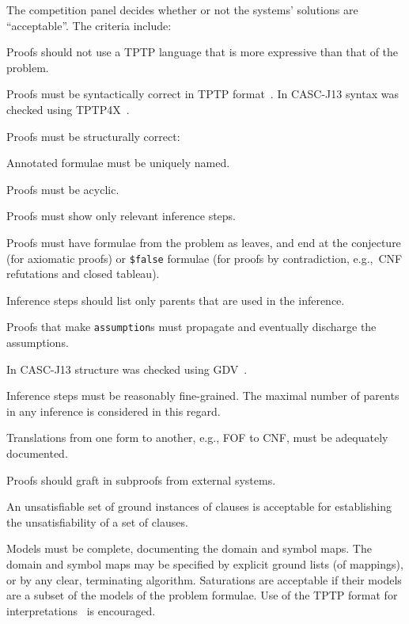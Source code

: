 \documentclass[aic]{iosart2x}
\newcommand{\smalltt}[1]{\small \texttt{#1}}
\newenvironment{packed_itemize}{
\vspace*{-0.3em}
\begin{itemize}
  \setlength{\partopsep}{0pt}
  \setlength{\itemsep}{1pt}
  \setlength{\parskip}{0pt}
  \setlength{\parsep}{0pt}
}{\end{itemize}}
\newcommand{\THIS}{\mbox{CASC-J13}}
\begin{document}
The competition panel decides whether or not the systems' solutions are ``acceptable''. 
The criteria include:
\begin{packed_itemize}
\item Proofs should not use a TPTP language that is more expressive than that of the problem.
\item Proofs must be syntactically correct in TPTP format~\cite{Sut07-CSR}.
      In \THIS{} syntax was checked using TPTP4X~\cite{Sut10}.
\item Proofs must be structurally correct:
      \begin{packed_itemize}
      \item Annotated formulae must be uniquely named.
      \item Proofs must be acyclic.
      \item Proofs must show only relevant inference steps.
      \item Proofs must have formulae from the problem as leaves, and end at the conjecture (for
            axiomatic proofs) or \smalltt{\$false} formulae (for proofs by contradiction,
            e.g.,~CNF refutations and closed tableau).
      \item Inference steps should list only parents that are used in the inference.
      \item Proofs that make \smalltt{assumption}s must propagate and eventually discharge the
            assumptions.
      \end{packed_itemize}
      In \THIS{} structure was checked using GDV~\cite{SB05}.
\item Inference steps must be reasonably fine-grained.
      The maximal number of parents in any inference is considered in this regard.
\item Translations from one form to another, e.g., FOF to CNF, must be adequately documented.
\item Proofs should graft in subproofs from external systems.
\item An unsatisfiable set of ground instances of clauses is acceptable for establishing the
      unsatisfiability of a set of clauses.
\item Models must be complete, documenting the domain and symbol maps.
      The domain and symbol maps may be specified by explicit ground lists (of mappings), or by
      any clear, terminating algorithm.
      Saturations are acceptable if their models are a subset of the models of the problem formulae.
      Use of the TPTP format for interpretations~\cite{SS+26} is encouraged.
\end{packed_itemize}
\end{document}
